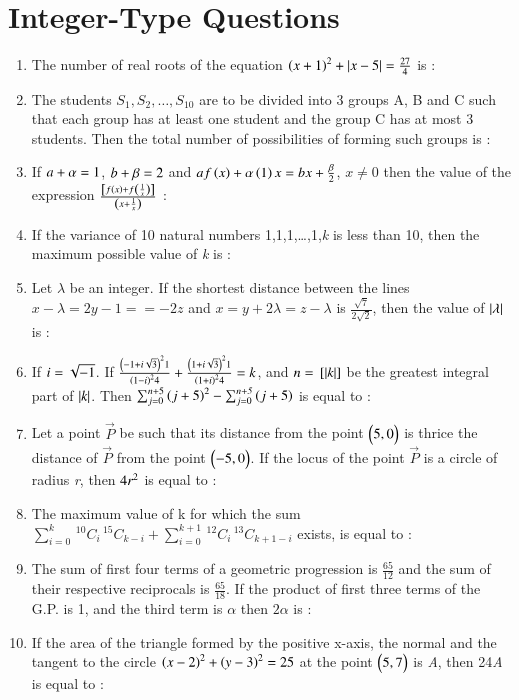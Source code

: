 \documentclass[journal,12pt,onecolumn]{IEEEtran}
\newcommand{\nCr}[2]{\,^{#1}C_{#2}}
\theoremstyle{remark}
\begin{document}
		\section{Integer-Type Questions}
\begin{enumerate}
	\item The number of real roots of the equation $ \left(x+1\right)^2 + \left\vert x-5\right\vert = \frac{27}{4} $ is : 
	\item The students $S_1, S_2, \dots, S_{10}$ are to be divided into 3 groups A, B and C such that each group has at least one student and the group C has at most 3 students. Then the total number of possibilities of forming such groups is :
	\item If $ \emph{a} + \alpha = 1 $, $ \emph{b} + \beta = 2 $ and $af\left(x\right) + \alpha\left(1\right){x} = bx + \frac{\beta}{2} $, $ x\neq0 $ then the value of the expression $\frac{{}\left[f\left(x\right) + f\left(\frac{1}{x}\right)\right]}{\left(x + \frac{1}{x}\right)}$ :
	\item If the variance of 10 natural numbers 1,1,1,\dots,1,\emph{k} is less than 10, then the maximum possible value of \emph{k} is :
	\item Let $\lambda$ be an integer. If the shortest distance between the lines $ x - \lambda = 2y - 1 = = -2z $ and $ x = y + 2\lambda = z - \lambda $ is $\frac{\sqrt{7}}{2\sqrt{2}}$, then the value of $\left\vert\lambda\right\vert$ is :
	\item If $ \emph{i} = \sqrt{-1} $. If $ \frac{\left(-1+\emph{i}\sqrt{3}\right)^21}{\left(1-\emph{i}\right)^24} + \frac{\left(1+\emph{i}\sqrt{3}\right)^21}{\left(1+\emph{i}\right)^24} = \emph{k}$, and $ \emph{n} = {}\left[\left\vert\emph{k}\right\vert\right]$ be the greatest integral part of $\left\vert\emph{k}\right\vert$. Then $ \sum_{j=0}^{\emph{n}+5} \left(j+5\right)^2 - \sum_{j=0}^{\emph{n+5}} \left(j+5\right) $ is equal to :
	\item Let a point $\vec{P}$ be such that its distance from the point $\begin{pmatrix}5,0\end{pmatrix}$ is thrice the distance of $\vec{P}$ from the point $\begin{pmatrix}-5,0\end{pmatrix}$. If the locus of the point $\vec{P}$ is a circle of radius \emph{r}, then $4\emph{r}^2$ is equal to :
	\item The maximum value of k for which the sum $ \sum_{i=0}^{k} \nCr{10}{i} \nCr{15}{k-i} + \sum_{i=0}^{k+1} \nCr{12}{i} \nCr{13}{k+1-i} $ exists, is equal to :

	\item The sum of first four terms of a geometric progression is $\frac{65}{12}$ and the sum of their respective reciprocals is $\frac{65}{18}$. If the product of first three terms of the G.P. is 1, and the third term is $\alpha$ then $2\alpha$ is :

	\item If the area of the triangle formed by the positive x-axis, the normal and the tangent to the circle $\left(x-2\right)^2 + \left(y-3\right)^2 = 25$ at the point $\begin{pmatrix}5,7\end{pmatrix}$ is \emph{A}, then 24\emph{A} is equal to :
\end{enumerate}
 
\end{document}
